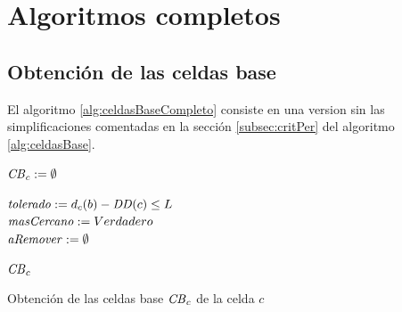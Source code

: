 \chapter{Algoritmos completos}

\section{Obtención de las celdas base}\label{algComp:celdasbase}
El algoritmo \ref{alg:celdasBaseCompleto} consiste en una version sin las
simplificaciones comentadas en la sección \ref{subsec:critPer} del algoritmo
\ref{alg:celdasBase}.

\begin{algorithm}[H]
\SetAlgoLined

  $\mathit{CB}_c := \emptyset$

   {
     {
      $\mathit{tolerado}  := d_c(b) - \mathit{DD}(c) \leq L$\\

      $\mathit{masCercano} := Verdadero$\\
      $\mathit{aRemover} := \emptyset$\\
       {
      }
      
    }
  }
  \Return $\mathit{CB}_c$ 

  \caption{Obtención de las celdas base $\mathit{CB}_c$ de la celda $c$}
  \label{alg:celdasBaseCompleto}
\end{algorithm}

